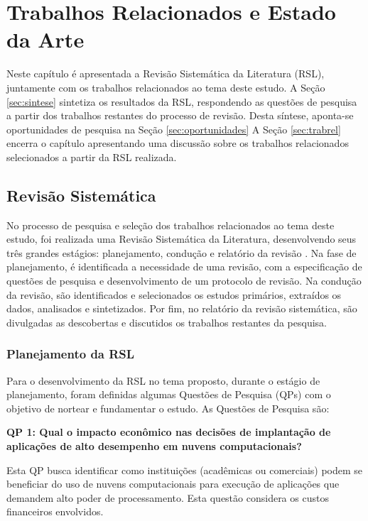 \documentclass[tese,capa]{texufpel}
\begin{document}
\chapter{Trabalhos Relacionados e Estado da Arte}\label{chap:trabEst}

Neste capítulo é apresentada a Revisão Sistemática da Literatura (RSL), juntamente com os trabalhos relacionados ao tema deste estudo. A Seção \ref{sec:sintese} sintetiza os resultados da RSL, respondendo as questões de pesquisa a partir dos trabalhos restantes do processo de revisão. Desta síntese, aponta-se oportunidades de pesquisa na Seção \ref{sec:oportunidades} A Seção \ref{sec:trabrel} encerra o capítulo apresentando uma discussão sobre os trabalhos relacionados selecionados a partir da RSL realizada.

\section{Revisão Sistemática}\label{sec:revisao}

No processo de pesquisa e seleção dos trabalhos relacionados ao tema deste estudo, foi realizada uma Revisão Sistemática da Literatura, desenvolvendo seus três grandes estágios: planejamento, condução e relatório da revisão \cite{xiaoGuidanceConductingSystematic2017a}. Na fase de planejamento, é identificada a necessidade de uma revisão, com a especificação de questões de pesquisa e desenvolvimento de um protocolo de revisão. Na condução da revisão, são identificados e selecionados os estudos primários, extraídos os dados, analisados e sintetizados. Por fim, no relatório da revisão sistemática, são divulgadas as descobertas e discutidos os trabalhos restantes da pesquisa.

\subsection{Planejamento da RSL}\label{sec:planejamentoRSL}

Para o desenvolvimento da RSL no tema proposto, durante o estágio de planejamento, foram definidas algumas Questões de Pesquisa (QPs) com o objetivo de nortear e fundamentar o estudo. As Questões de Pesquisa são:

\textbf{QP 1: Qual o impacto econômico nas decisões de implantação de aplicações de alto desempenho em nuvens computacionais?}

Esta QP busca identificar como instituições (acadêmicas ou comerciais) podem se beneficiar do uso de nuvens computacionais para execução de aplicações que demandem alto poder de processamento. Esta questão considera os custos financeiros envolvidos.
\end{document}
